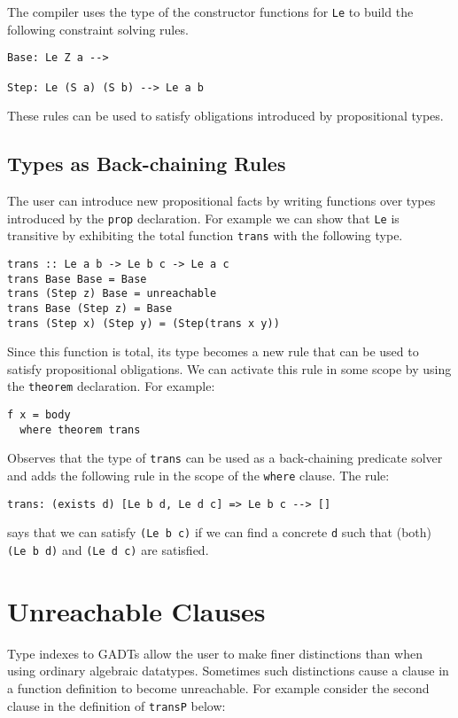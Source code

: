 \documentclass[11pt,twoside]{article}
\begin{document}
The compiler uses the type of the constructor functions
for {\tt Le} to build the following constraint solving rules.

\begin{verbatim}
Base: Le Z a -->

Step: Le (S a) (S b) --> Le a b
\end{verbatim}
These rules can be used to satisfy obligations introduced
by propositional types. 


\subsection{Types as Back-chaining Rules}\label{back}

The user can introduce
new propositional facts by writing functions over types
introduced by the {\tt prop} declaration. For example
we can show that {\tt Le} is transitive by exhibiting
the total function {\tt trans} with the following type.

\begin{verbatim}
trans :: Le a b -> Le b c -> Le a c
trans Base Base = Base
trans (Step z) Base = unreachable
trans Base (Step z) = Base
trans (Step x) (Step y) = (Step(trans x y))  
\end{verbatim}

Since this function is total, its type becomes a new rule
that can be used to satisfy propositional obligations. We
can activate this rule in some scope by using the {\tt theorem} declaration.
For example:
\begin{verbatim}
f x = body
  where theorem trans
\end{verbatim}
Observes that the type of {\tt trans} can be used
as a back-chaining predicate solver and adds the following rule
in the scope of the {\tt where} clause. The rule:

\begin{verbatim}
trans: (exists d) [Le b d, Le d c] => Le b c --> []
\end{verbatim}   
says that we can satisfy {\tt (Le b c)} if we can find
a concrete {\tt d} such that (both) {\tt (Le b d)} and {\tt (Le d c)}
are satisfied.


\section{Unreachable Clauses}

Type indexes to GADTs allow the user to make finer distinctions
than when using ordinary algebraic datatypes. Sometimes such
distinctions cause a clause in a function definition to become
unreachable. For example consider the second clause in the definition of 
{\tt transP} below:
\end{document}
